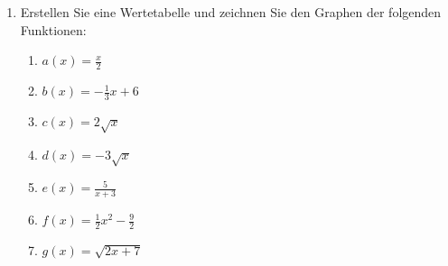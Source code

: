 \begin{ueb}
\begin{enumerate}
              \begin{enumerate}
                  \item Für welche Argumente \(x\) ist \(f(x)=3\)?
                  \item Für welche Stellen \(x\) ist \(y=0\)?
                  \item Welchen Wert hat \(f(2)\) und welchen Wert hat \(f(5)\)?
              \end{enumerate}

              \begin{center}
              \end{center}
        \item Erstellen Sie eine Wertetabelle und zeichnen Sie den Graphen
              der folgenden Funktionen:

              \begin{enumerate}
                  \item \(a(x)=\frac{x}{2}\)
                  \item \(b(x)=-\frac{1}{3}x+6\)
                  \item \(c(x)=2\sqrt{x}\)
                  \item \(d(x)=-3\sqrt{x}\)
                  \item \(e(x)=\frac{5}{x+3}\)
                  \item \(f(x)=\frac{1}{2}x^2-\frac{9}{2}\)
                  \item \(g(x)=\sqrt{2x+7}\)
              \end{enumerate}


\end{enumerate}
\end{ueb}
